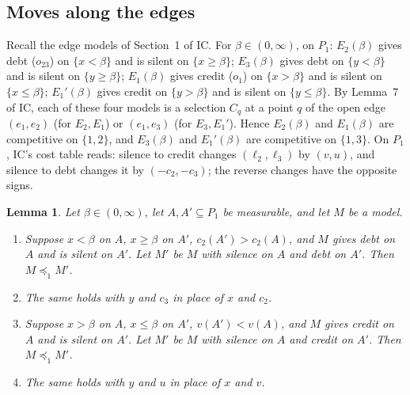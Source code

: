 \documentclass[11pt]{article}
\newtheorem{lemma}[theorem]{Lemma}
\theoremstyle{definition}\newtheorem{definition}[theorem]{Definition}
\theoremstyle{remark}\newtheorem{remark}[theorem]{Remark}
\begin{document}
\subsection{Moves along the edges}

Recall the edge models of Section~1 of IC. For $\beta\in(0,\infty)$,
on $P_1$: $E_2(\beta)$ gives debt ($o_{23}$) on $\{x<\beta\}$ and is silent on
$\{x\ge\beta\}$; $E_3(\beta)$ gives debt on $\{y<\beta\}$ and is silent on
$\{y\ge\beta\}$; $E_1(\beta)$ gives credit ($o_1$) on $\{x>\beta\}$ and is
silent on $\{x\le\beta\}$; $E_1'(\beta)$ gives credit on $\{y>\beta\}$ and is
silent on $\{y\le\beta\}$. By Lemma~7 of IC, each of these four
models is a selection $C_q$ at a point $q$ of the open edge $(e_1,e_2)$ (for
$E_2,E_1$) or $(e_1,e_3)$ (for $E_3,E_1'$). Hence $E_2(\beta)$ and
$E_1(\beta)$ are competitive on $\{1,2\}$, and $E_3(\beta)$ and $E_1'(\beta)$
are competitive on $\{1,3\}$. On $P_1$, IC's cost table reads: silence to
credit changes $(\ell_2,\ell_3)$ by $(v,u)$, and silence to debt changes it
by $(-c_2,-c_3)$; the reverse changes have the opposite signs.

\begin{lemma}\label{lem:sep-moves}
Let $\beta\in(0,\infty)$, let $A,A'\subseteq P_1$ be measurable, and let $M$
be a model.
\begin{enumerate}[label=(\roman*)]
\item Suppose $x<\beta$ on $A$, $x\ge\beta$ on $A'$, $c_2(A')>c_2(A)$, and $M$
gives debt on $A$ and is silent on $A'$. Let $M'$ be $M$ with silence on $A$
and debt on $A'$. Then $M\preceq_1M'$.
\item The same holds with $y$ and $c_3$ in place of $x$ and $c_2$.
\item Suppose $x>\beta$ on $A$, $x\le\beta$ on $A'$, $v(A')<v(A)$, and $M$
gives credit on $A$ and is silent on $A'$. Let $M'$ be $M$ with silence on
$A$ and credit on $A'$. Then $M\preceq_1M'$.
\item The same holds with $y$ and $u$ in place of $x$ and $v$.
\end{enumerate}
\end{lemma}
\end{document}
